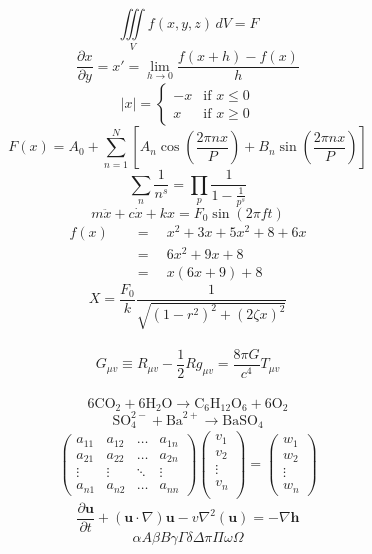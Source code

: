 \documentclass{article}
\begin{document}
\begin{center}

\[\iiint\limits_V f(x,y,z) \,dV = F\]
\[\frac{\partial x}{\partial y} = x' = \lim_{h\to0} \frac{f(x+h) - f(x)}{h} \] 
\[|x| =
\begin{cases}
-x & \text{if $x\le 0$}\\
x & \text{if $x\ge 0$}
\end{cases}\]
\[F(x) = A_0 + \sum\limits_{n=1}^N \left[ A_n \cos \left(\frac{2 \pi nx}{P}\right) + B_n \sin \left(\frac{2 \pi nx}{P}\right) \right] \]
\[\sum\limits_{n} \frac{1}{n^s} = \prod\limits_{p} \frac{1}{1-\frac{1}{p^s}}\]
\[m\ddot{x} + c\dot{x} + kx = F_0 \sin (2 \pi ft) \]
\begin{align*}
f(x) \quad & = \quad x^2 +3x + 5x^2 + 8 + 6x \\
	\quad & = \quad 6x^2 + 9x + 8 \\
	\quad & = \quad x(6x + 9) + 8 
\end{align*}
\[ X = \frac{F_0}{k} \frac{1}{\sqrt{(1-r^2)^2 + (2 \zeta x)^2}}\]\\
\[ G_{\mu v} \equiv R_{\mu v} - \frac{1}{2} Rg_{\mu v} = \frac{8 \pi G}{c^4} T_{\mu v} \] \\
\[ 6\text{CO}_2 + 6\text{H}_2\text{O} \rightarrow \text{C}_6\text{H}_{12}\text{O}_6 + 6\text{O}_2 \]
\[ \text{SO}^{2-}_4 + \text{Ba}^{2+} \rightarrow \text{BaSO}_4 \]
\begin{align*}
\begin{pmatrix}
a_{11} & a_{12} & \dots & a_{1n} \\
a_{21} & a_{22} & \dots & a_{2n} \\
\vdots & \vdots & \ddots & \vdots \\
a_{n1} & a_{n2} & \dots & a_{nn} 
\end{pmatrix} 
\begin{pmatrix}
v_1 \\
v_2 \\
\vdots \\
v_n \\
\end{pmatrix}
= 
\begin{pmatrix}
w_1 \\
w_2 \\
\vdots \\
w_n
\end{pmatrix}
\end{align*}
\[ \frac{\partial \textbf{u}}{\partial t} + (\textbf{u} \cdot \nabla )\textbf{u} - v \nabla^2(\textbf{u}) = - \nabla \textbf{h} \]
\[\alpha A \beta B \gamma \Gamma \delta \Delta \pi \Pi \omega \Omega\]
\end{center}
\end{document}
